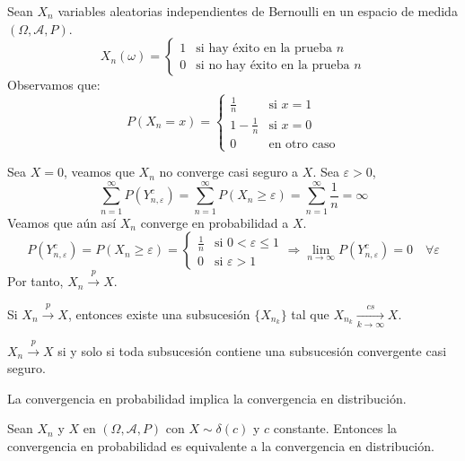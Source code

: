 \begin{example}
    Sean $X_n$ variables aleatorias independientes de Bernoulli en un espacio de medida $(\Omega, \mathcal{A}, P)$.
    $$X_n(\omega) = \begin{cases}
            1 & \text{si hay éxito en la prueba } n    \\
            0 & \text{si no hay éxito en la prueba } n
        \end{cases}$$
    Observamos que:
    $$P(X_n = x) = \begin{cases}
            \frac{1}{n}     & \text{si } x = 1    \\
            1 - \frac{1}{n} & \text{si } x = 0    \\
            0               & \text{en otro caso}
        \end{cases}$$

    Sea $X = 0$, veamos que $X_n$ no converge casi seguro a $X$.
    Sea $\varepsilon > 0$,
    $$\sum_{n=1}^\infty P(Y_{n, \varepsilon}^c) = \sum_{n=1}^\infty P(X_n \geq \varepsilon) = \sum_{n=1}^\infty \frac{1}{n} = \infty$$
    Veamos que aún así $X_n$ converge en probabilidad a $X$.
    $$P(Y_{n, \varepsilon}^c) = P(X_n \geq \varepsilon) = \begin{cases}
            \frac{1}{n} & \text{si } 0 < \varepsilon \leq 1 \\
            0           & \text{si } \varepsilon > 1
        \end{cases} \Rightarrow \lim\limits_{n \to \infty} P(Y_{n, \varepsilon}^c) = 0 \quad \forall \varepsilon$$
    Por tanto, $X_n \xrightarrow{p} X$.
\end{example}

\begin{theorem}
    Si $X_n \xrightarrow{p} X$, entonces existe una subsucesión $\{X_{n_k}\}$ tal que $X_{n_k} \xrightarrow[k \to \infty]{cs} X$.
\end{theorem}

\begin{theorem}
    $X_n \xrightarrow{p} X$ si y solo si toda subsucesión contiene una subsucesión convergente casi seguro.
\end{theorem}

\begin{theorem}
    La convergencia en probabilidad implica la convergencia en distribución.
\end{theorem}

\begin{theorem}
    Sean $X_n$ y $X$ en $(\Omega, \mathcal{A}, P)$ con $X \sim \delta(c)$ y $c$ constante.
    Entonces la convergencia en probabilidad es equivalente a la convergencia en distribución.
\end{theorem}


